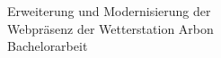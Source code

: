 \begin{titlepage}

\begin{center}
	\vspace{6cm}
	\textsf{\Huge Erweiterung und Modernisierung der} \\
	\vspace{3mm}
	\textsf{\Huge Webpräsenz der Wetterstation Arbon} \\
	\vspace{15mm}
	\textsf{\LARGE{Bachelorarbeit}}\\
\end{center}



\end{titlepage}
